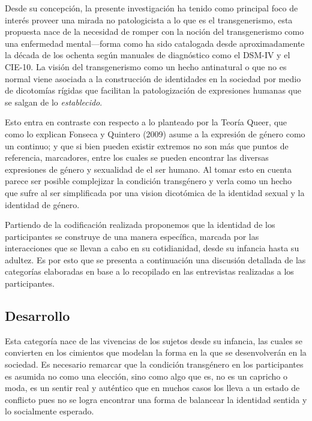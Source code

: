 Desde su concepción, la presente investigación ha tenido como principal foco de
interés proveer una mirada no patologicista a lo que es el transgenerismo, esta
propuesta nace de la necesidad de romper con la noción del transgenerismo como
una enfermedad mental—forma como ha sido catalogada desde aproximadamente la
década de los ochenta según manuales de diagnóstico como el DSM-IV y el CIE-10.
La visión del transgenerismo como un hecho antinatural o que no es normal viene
asociada a la construcción de identidades en la sociedad por medio de dicotomías
rígidas que facilitan la patologización de expresiones humanas que se salgan de
lo \emph{establecido}.

Esto entra en contraste con respecto a lo planteado por la Teoría Queer, que
como lo explican Fonseca y Quintero (2009) asume a la expresión de género como
un continuo; y que  si bien pueden existir extremos no son más que puntos de
referencia, marcadores, entre los cuales se pueden encontrar las diversas
expresiones de género y sexualidad de el ser humano. Al tomar esto en cuenta
parece ser posible complejizar la condición transgénero y verla como un hecho
que sufre al ser simplificada por una vision dicotómica de la identidad sexual y
la identidad de género.

Partiendo de la codificación realizada proponemos que la identidad de los
participantes se construye de una manera específica, marcada por las
interacciones que se llevan a cabo en su cotidianidad, desde su infancia hasta
su adultez. Es por esto que se presenta a continuación una discusión detallada
de las categorías elaboradas en base a lo recopilado en las entrevistas
realizadas a los participantes.

\subsection{Desarrollo}

Esta categoría nace de las vivencias de los sujetos desde su infancia, las
cuales se convierten en los cimientos que modelan la forma en la que se
desenvolverán en la sociedad. Es necesario remarcar que la condición transgénero
en los participantes es asumida no como una elección, sino como algo que es, no
es un capricho o moda, es un sentir real y auténtico que en muchos casos los
lleva a un estado de conflicto pues no se logra encontrar una forma de balancear
la identidad sentida y lo socialmente esperado.

